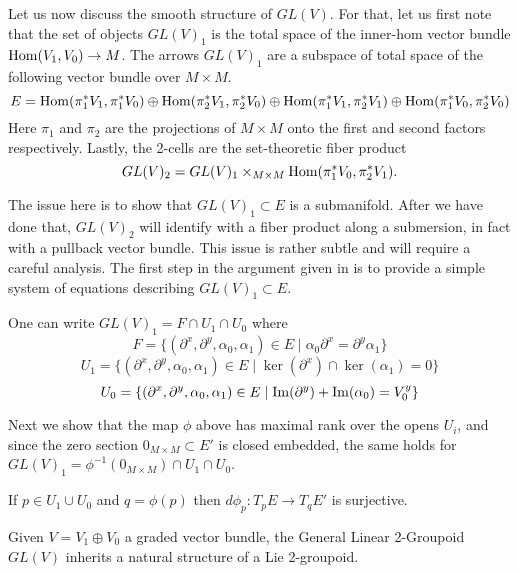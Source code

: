 Let us now discuss the smooth structure of $GL(V)$.
For that, let us first note that the set of objects $GL(V)_1$ is the total space of the inner-hom vector bundle $\operatorname{Hom}(V_1,V_0)\to M$.
The arrows $GL(V)_1$ are a subspace of total space of the following vector bundle over $M\times M$.
\[ E=\operatorname{Hom}(\pi_1^*V_1,\pi_1^*V_0)\oplus \operatorname{Hom}(\pi_2^*V_1,\pi_2^*V_0)\oplus \operatorname{Hom}(\pi_1^*V_1,\pi_2^*V_1)\oplus \operatorname{Hom}(\pi_1^*V_0,\pi_2^*V_0) \]
Here $\pi_1$ and $\pi_2 $ are the projections of $M\times M$ onto the first and second factors respectively.
Lastly, the 2-cells are the set-theoretic fiber product
\[ GL(V)_2 = GL(V)_1\times_{M\times M} \operatorname{Hom}(\pi_1^*V_0, \pi_2^*V_1) . \]

The issue here is to show that $GL(V)_1\subset E$ is a submanifold.
After we have done that, $GL(V)_2$ will identify with a fiber product along a submersion, in fact with a pullback vector bundle. This issue is rather subtle and will require a careful analysis. The first step in the argument given in \cite{dhs19} is to provide a simple system of equations describing $GL(V)_1\subset E$.

\begin{lemma}
One can write $GL(V)_1=F\cap U_1\cap U_0$ where
\[ F = \{ (\partial^x,\partial^y,\alpha_0, \alpha_1)\in E \mid \alpha_0\partial^x = \partial^y\alpha_1 \} \]
\[ U_1 = \{ (\partial^x,\partial^y,\alpha_0,\alpha_1)\in E \mid \ker(\partial^x)\cap\ker(\alpha_1) = 0 \} \]
\[ U_0 = \{ (\partial^x,\partial^y,\alpha_0,\alpha_1)\in E \mid \operatorname{Im}(\partial^y) + \operatorname{Im}(\alpha_0) = V_0^y \} \]
\end{lemma}

Next we show that the map $\phi$ above has maximal rank over the opens $U_i$, and since the zero section $0_{M\times M}\subset E'$ is closed embedded, the same holds for $GL(V)_1=\phi^{-1}(0_{M\times M})\cap U_1\cap U_0$.

\begin{prop}
If $p\in U_1\cup U_0$ and $q=\phi(p)$ then $d\phi_p:T_pE\to T_qE'$ is surjective.
\end{prop}

\begin{thm}
Given $V=V_1\oplus V_0$ a graded vector bundle, the General Linear 2-Groupoid $GL(V)$ inherits a natural structure of a Lie 2-groupoid.
\end{thm}
